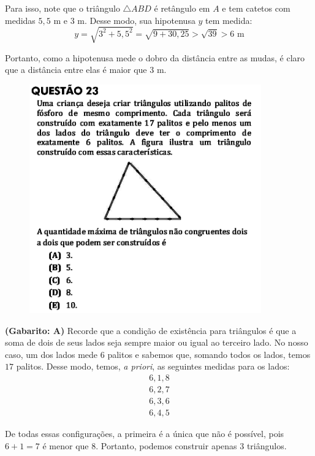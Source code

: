 \documentclass[a4paper]{article}
\begin{document}
\par\vspace{0.3cm} Para isso, note que o triângulo $\triangle ABD$ é retângulo em $A$ e tem catetos com medidas $5,5$ m e $3$ m. Desse modo, sua hipotenusa $y$ tem medida:
\begin{equation*}
y = \sqrt{3^2 + 5,5^2} = \sqrt{9 + 30,25} > \sqrt{39} > 6\text{ m}
\end{equation*}
\par\vspace{0.3cm} Portanto, como a hipotenusa mede o dobro da distância entre as mudas, é claro que a distância entre elas é maior que $3$ m.

\begin{figure}[H]
	\begin{center}
		\includegraphics[width=10cm]{L5Q23.png}
	\end{center}
\end{figure}
\par\textbf{(Gabarito: A)} Recorde que a condição de existência para triângulos é que a soma de dois de seus lados seja sempre maior ou igual ao terceiro lado. No nosso caso, um dos lados mede $6$ palitos e sabemos que, somando todos os lados, temos $17$ palitos. Desse modo, temos, \textit{a priori}, as seguintes medidas para os lados:
\begin{align*}
6, 1, 8 \\
6, 2, 7 \\
6, 3, 6 \\
6, 4, 5
\end{align*}
\par\vspace{0.3cm} De todas essas configurações, a primeira é a única que não é possível, pois $6+1=7$ é menor que $8$. Portanto, podemos construir apenas $3$ triângulos.
\end{document}
